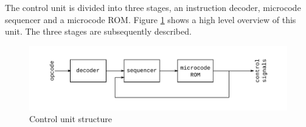 The control unit is divided into three stages, an instruction decoder,
microcode sequencer and a microcode ROM. Figure \ref{fig:control} shows a high
level overview of this unit. The three stages are subsequently described.
\begin{figure}[h]
	\centering
	\includegraphics[width=\textwidth]{../fig/control.pdf}
	\caption{Control unit structure}
	\label{fig:control}
\end{figure}
